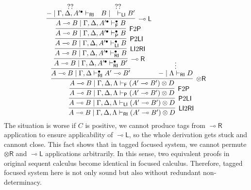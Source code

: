 \documentclass[submission,copyright,creativecommons]{eptcs}
\newcommand{\tr}{\otimes \mathsf{R}}
\newcommand{\lright}{\multimap \mathsf{R}}
\newcommand{\lleft}{\multimap \mathsf{L}}
\newcommand{\ot}{\otimes}
\newcommand{\lolli}{\multimap}
\newcommand{\RI}{\mathsf{RI}}
\newcommand{\LI}{\mathsf{LI}}
\newcommand{\Pass}{\mathsf{P}}
\newcommand{\F}{\mathsf{F}}
\begin{document}
\begin{displaymath}
  \infer[\LI 2 \RI]{A \lolli B \mid \Gamma , \Delta , \Lambda \vdash_{\RI} (A' \lolli B') \ot D}{
    \infer[\Pass 2 \LI]{A \lolli B \mid \Gamma , \Delta , \Lambda \vdash_{\LI} (A' \lolli B') \ot D}{
      \infer[\F 2 \Pass]{A \lolli B \mid \Gamma , \Delta , \Lambda \vdash_{\Pass} (A' \lolli B') \ot D}{
        \infer[\tr]{A \lolli B \mid \Gamma , \Delta , \Lambda \vdash_{\F} (A' \lolli B') \ot D}{
          \infer{A \lolli B \mid \Gamma , \Delta \vdash^{\bullet}_{\RI} A' \lolli B'}{
            \infer[\lright]{A \lolli B \mid \Gamma , \Delta , A'^{\bullet} \vdash^{\bullet}_{\RI} B'}{
              \infer[\LI 2 \RI]{A \lolli B \mid \Gamma , \Delta , A'^{\bullet} \vdash^{\bullet}_{\RI} B}{
                \infer[\Pass 2 \LI]{A \lolli B \mid \Gamma , \Delta , A'^{\bullet} \vdash^{\bullet}_{\LI} B}{
                  \infer[\F 2 \Pass]{A \lolli B \mid \Gamma , \Delta , A'^{\bullet} \vdash^{\bullet}_{\Pass} B}{
                    \infer[\lleft]{A \lolli B \mid \Gamma , \Delta , A'^{\bullet} \vdash^{\bullet}_{\F} B}{
                      \deduce{- \mid \Gamma , \Delta , A'^{\bullet} \vdash_{\RI}}{??}
                      &
                      \deduce{B \mid \quad \vdash_{\LI} B'}{??}
                    }
                  }
                }
              }
            }
          }
          &
          \deduce{- \mid \Lambda \vdash_{\RI} D}{\vdots}
        }
      }
    }
  }
\end{displaymath}
The situation is worse if $C$ is positive, we cannot produce tags from $\lright$ application to ensure applicability of $\lleft$, so the whole derivation gets stuck and cannont close.
This fact shows that in tagged focused system, we cannot permute $\tr$ and $\lleft$ applications arbitrarily.
In this sense, two equivalent proofs in original sequent calculus become identical in focused calculus.
Therefore, tagged focused system here is not only sound but also without redundant non-determinacy.
\end{document}
